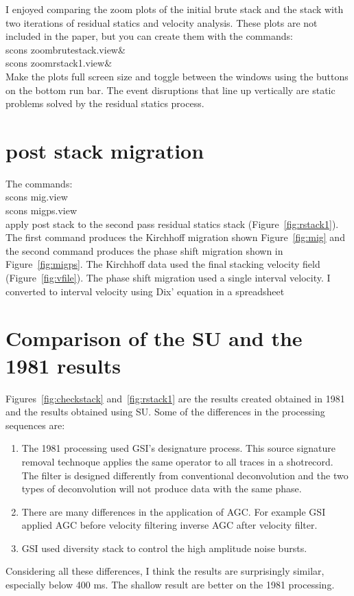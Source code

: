 I enjoyed comparing the zoom plots of the initial brute stack and the stack 
with two iterations of residual statics and velocity analysis.  These plots
are not included in the paper, but you can create them with the commands:\\
scons zoombrutestack.view\& \\
scons zoomrstack1.view\& \\
Make the plots full screen size and toggle between the windows using the 
buttons on the bottom run bar.  The event disruptions that line up vertically
are static problems solved by the residual statics process.
  

\section{post stack migration}
The commands:\\
scons mig.view\\
scons migps.view\\
apply post stack to the second pass residual statics stack 
(Figure~\ref{fig:rstack1}). The first command produces the Kirchhoff 
migration shown Figure~\ref{fig:mig} and the second command produces the 
phase shift migration shown in Figure~\ref{fig:migps}.  The Kirchhoff data 
used the final stacking velocity field (Figure~\ref{fig:vfile}).  The phase 
shift migration used a single interval velocity.  I converted to interval 
velocity using Dix' equation in a spreadsheet


\section{Comparison of the SU and the 1981 results}
Figures~\ref{fig:checkstack} and~\ref{fig:rstack1} are the results created 
obtained in 1981 and the results obtained using SU.  Some of the differences 
in the processing sequences are:
\begin{enumerate}
\item The 1981 processing used GSI's designature process.  This source 
signature removal technoque applies the same operator to all traces in a 
shotrecord.  The filter is designed differently from conventional 
deconvolution and the two types of deconvolution will not produce data 
with the same phase. 
\item There are many differences in the application of AGC.  For example 
GSI applied AGC before velocity filtering inverse AGC after velocity filter.
\item GSI used diversity stack to control the high amplitude noise bursts.
\end{enumerate}
Considering all these differences, I think the results are surprisingly 
similar, especially below 400 ms.  The shallow result are better on the 
1981 processing.

